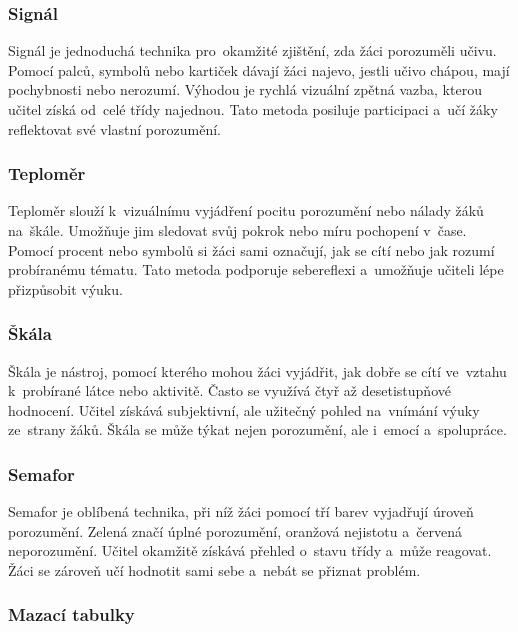 \documentclass[male,czech,api_bc]{kitheses}
\begin{document}
\subsubsection{Signál}

Signál je jednoduchá technika pro~okamžité zjištění, zda žáci porozuměli učivu. Pomocí palců, symbolů nebo kartiček dávají žáci najevo, jestli učivo chápou, mají pochybnosti nebo nerozumí. Výhodou je rychlá vizuální zpětná vazba, kterou učitel získá od~celé třídy najednou. Tato metoda posiluje participaci a~učí žáky reflektovat své vlastní porozumění.\cite{eduSignal}

\subsubsection{Teploměr}

Teploměr slouží k~vizuálnímu vyjádření pocitu porozumění nebo nálady žáků na~škále. Umožňuje jim sledovat svůj pokrok nebo míru pochopení v~čase. Pomocí procent nebo symbolů si žáci sami označují, jak se cítí nebo jak rozumí probíranému tématu. Tato metoda podporuje sebereflexi a~umožňuje učiteli lépe přizpůsobit výuku.\cite{eduTeplomer}

\subsubsection{Škála}

Škála je nástroj, pomocí kterého mohou žáci vyjádřit, jak dobře se cítí ve~vztahu k~probírané látce nebo aktivitě. Často se využívá čtyř až desetistupňové hodnocení. Učitel získává subjektivní, ale užitečný pohled na~vnímání výuky ze~strany žáků. Škála se může týkat nejen porozumění, ale i~emocí a~spolupráce.\cite{eduSkala}

\subsubsection{Semafor}

Semafor je oblíbená technika, při níž žáci pomocí tří barev vyjadřují úroveň porozumění. Zelená značí úplné porozumění, oranžová nejistotu a~červená neporozumění. Učitel okamžitě získává přehled o~stavu třídy a~může reagovat. Žáci se zároveň učí hodnotit sami sebe a~nebát se přiznat problém.\cite{eduSemafor}

\subsubsection{Mazací tabulky}
\end{document}
